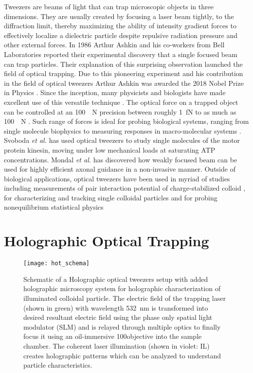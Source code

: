 Tweezers are beams of light that can trap microscopic objects in three dimensions. They are usually created by focusing a laser beam tightly, to the diffraction limit, thereby maximizing the ability of intensity gradient forces to effectively localize a dielectric particle despite repulsive radiation pressure and other external forces. In 1986 Arthur Ashkin and his co-workers \cite{Ashkin:86} from Bell Laboratories reported their experimental discovery that a single focused beam can trap particles. Their explanation of this surprising observation launched the field of optical trapping. Due to this pioneering experiment and his contribution in the field of optical tweezers Arthur Ashkin was awarded the 2018 Nobel Prize in Physics \cite{nobel_media_2019}. Since the inception, many physicists and biologists have made excellent use of this versatile technique \cite{grier2003nature}. The optical force on a trapped object can be controlled at an \SI{100}{\newton} precision between roughly \SI{1}{\femto \newton} to as much as \SI{100}{\newton} \cite{Rohrbach:02}. Such range of forces is ideal for probing biological systems, ranging from single molecule biophysics to measuring responses in macro-molecular systems \cite{Svoboda1994,Litvinov7426,Brouhard2003}. Svoboda \emph{et al.}  \cite{Svoboda11782} has used optical tweezers to study single molecules of the motor protein kinesin, moving under low mechanical loads at saturating ATP concentrations. Mondal \emph{et al.} \cite{argha2014} has discovered how weakly focused beam can be used for highly efficient axonal guidance in a non-invasive manner. Outside of biological applications, optical tweezers have been used in myriad of studies including measurements of pair interaction potential of charge-stabilized colloid \cite{crocker1994}, for characterizing and tracking single colloidal particles \cite{Lee07colloid, Cheong2009, xiao2010, chen2015, chen2016} and for probing nonequilibrium statistical physics \cite{Xiao2011, Lee2006, Yizhou2017, Benjamin2016, Grier_2004}


\section{Holographic Optical Trapping}
\label{sec:HOT}


\begin{figure}[t!]
  \centering
  \texttt{[image: hot\_schema]}
  \caption{Schematic of a Holographic optical tweezers setup with added holographic microscopy system for holographic characterization of illuminated colloidal particle. The electric field of the trapping laser (shown in green) with wavelength \SI{532}{\nano\meter} is transformed into desired resultant electric field using the phase only spatial light modulator (SLM) and is relayed through multiple optics to finally focus it using an oil-immersive 100\texttimes objective into the sample chamber. The coherent laser illumination (shown in violet: IL) creates holographic patterns which can be analyzed to understand particle characteristics.}
  \label{fig:HOTsetup}
\end{figure}


